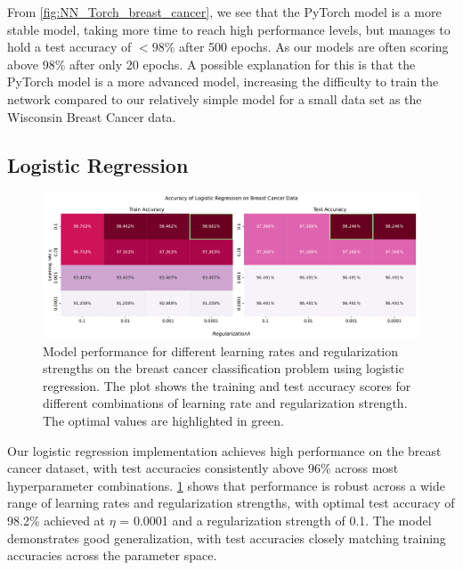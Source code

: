 From \cref{fig:NN_Torch_breast_cancer}, we see that the PyTorch model is a more stable model, taking more time to reach high performance levels, but manages to hold a test accuracy of $<98\%$ after 500 epochs. As our models are often scoring above 98\% after only 20 epochs. A possible explanation for this is that the PyTorch model is a more advanced model, increasing the difficulty to train the network compared to our relatively simple model for a small data set as the Wisconsin Breast Cancer data.

\subsection{Logistic Regression}

\onecolumngrid
\begin{figure}[ht!]
    \centering
    \includegraphics[width = .9\textwidth]{../figs/logistic_regression_gridsearch.pdf}
    \caption{Model performance for different learning rates and regularization strengths on the breast cancer classification problem using logistic regression. The plot shows the training and test accuracy scores for different combinations of learning rate and regularization strength. The optimal values are highlighted in green.}
    \label{fig:logistic_regression_gridsearch}
\end{figure}
\twocolumngrid

Our logistic regression implementation achieves high performance on the breast cancer dataset, with test accuracies consistently above 96\% across most hyperparameter combinations. \cref{fig:logistic_regression_gridsearch} shows that performance is robust across a wide range of learning rates and regularization strengths, with optimal test accuracy of 98.2\% achieved at $\eta$ = 0.0001 and a regularization strength of 0.1. The model demonstrates good generalization, with test accuracies closely matching training accuracies across the parameter space.

